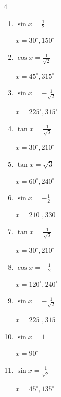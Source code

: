 \begin{multicols}{4}
\begin{enumerate}
        $\displaystyle x = 0^{\circ} , 180^{\circ}$

  \item $\displaystyle \sin{x}  = \frac{1}{2}$

        $\displaystyle x = 30^{\circ} , 150^{\circ}$

  \item $\displaystyle \cos{x}  = \frac{1}{\sqrt{2}}$

        $\displaystyle x = 45^{\circ} , 315^{\circ}$

  \item $\displaystyle \sin{x}  = -\frac{1}{\sqrt{2}}$

        $\displaystyle x = 225^{\circ} , 315^{\circ}$

\columnbreak %

  \item $\displaystyle \tan{x}  = \frac{1}{\sqrt{3}}$

        $\displaystyle x = 30^{\circ} , 210^{\circ}$

  \item $\displaystyle \tan{x}  = \sqrt{3}$

        $\displaystyle x = 60^{\circ} , 240^{\circ}$

  \item $\displaystyle \sin{x}  = -\frac{1}{2}$

        $\displaystyle x = 210^{\circ} , 330^{\circ}$

  \item $\displaystyle \tan{x}  = \frac{1}{\sqrt{3}}$

        $\displaystyle x = 30^{\circ} , 210^{\circ}$

  \item $\displaystyle \cos{x}  = -\frac{1}{2}$

        $\displaystyle x = 120^{\circ} , 240^{\circ}$

  \item $\displaystyle \sin{x}  = -\frac{1}{\sqrt{2}}$

        $\displaystyle x = 225^{\circ} , 315^{\circ}$

  \item $\displaystyle \sin{x}  = 1$

        $\displaystyle x = 90^{\circ}$

  \item $\displaystyle \sin{x}  = \frac{1}{\sqrt{2}}$

        $\displaystyle x = 45^{\circ} , 135^{\circ}$


\end{enumerate}
\end{multicols}

